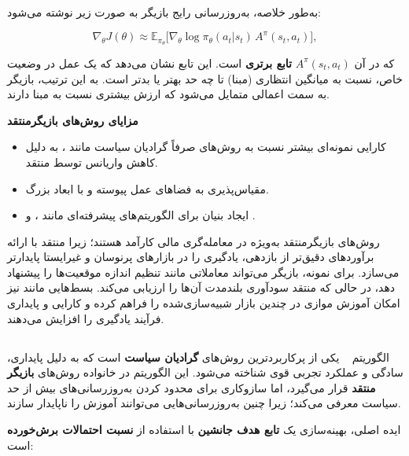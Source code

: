 \documentclass[12pt, a4paper]{report}
\begin{document}
به‌طور خلاصه، به‌روزرسانی رایج بازیگر به صورت زیر نوشته می‌شود:

\[
\nabla_\theta J(\theta) \approx \mathbb{E}_{\pi_\theta}\big[ \nabla_\theta \log \pi_\theta(a_t|s_t) \, A^{\pi}(s_t, a_t) \big],
\]

که در آن $A^{\pi}(s_t, a_t)$ \textbf{تابع برتری} است. این تابع نشان می‌دهد که یک عمل در وضعیت خاص، نسبت به میانگین انتظاری (مبنا) تا چه حد بهتر یا بدتر است. به این ترتیب، بازیگر به سمت اعمالی متمایل می‌شود که ارزش بیشتری نسبت به مبنا دارند.

\bigskip

\textbf{مزایای روش‌های بازیگر\lr{-}منتقد}
\begin{itemize}
    \item کارایی نمونه‌ای بیشتر نسبت به روش‌های صرفاً گرادیان سیاست مانند ، به دلیل کاهش واریانس توسط منتقد.
    \item مقیاس‌پذیری به فضاهای عمل پیوسته و با ابعاد بزرگ.
\item ایجاد بنیان برای الگوریتم‌های پیشرفته‌ای مانند ،  و .
\end{itemize}

\bigskip

روش‌های بازیگر\lr{-}منتقد به‌ویژه در معامله‌گری مالی کارآمد هستند؛ زیرا منتقد با ارائه برآوردهای دقیق‌تر از بازدهی، یادگیری را در بازارهای پرنوسان و غیرایستا پایدارتر می‌سازد. برای نمونه، بازیگر می‌تواند معاملاتی مانند تنظیم اندازه موقعیت‌ها را پیشنهاد دهد، در حالی که منتقد سودآوری بلندمدت آن‌ها را ارزیابی می‌کند. بسط‌هایی مانند  نیز امکان آموزش موازی در چندین بازار شبیه‌سازی‌شده را فراهم کرده و کارایی و پایداری فرآیند یادگیری را افزایش می‌دهند.  


\subsection{}

الگوریتم ~\cite{schulman2017proximal} یکی از پرکاربردترین روش‌های \textbf{گرادیان سیاست} است که به دلیل پایداری، سادگی و عملکرد تجربی قوی شناخته می‌شود. این الگوریتم در خانواده روش‌های \textbf{بازیگر \lr{-} منتقد} قرار می‌گیرد، اما سازوکاری برای محدود کردن به‌روزرسانی‌های بیش از حد سیاست معرفی می‌کند؛ زیرا چنین به‌روزرسانی‌هایی می‌توانند آموزش را ناپایدار سازند.

ایده اصلی، بهینه‌سازی یک \textbf{تابع هدف جانشین} با استفاده از \textbf{نسبت احتمالات برش‌خورده} است:  
\end{document}
